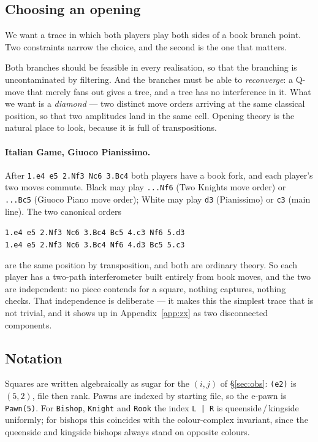 \documentclass[11pt,a4paper]{article}
\theoremstyle{definition}
\theoremstyle{plain}
\begin{document}
\subsection{Choosing an opening}

We want a trace in which both players play both sides of a book branch point.
Two constraints narrow the choice, and the second is the one that matters.

Both branches should be feasible in every realisation, so that the branching is
uncontaminated by filtering. And the branches must be able to \emph{reconverge}:
a Q-move that merely fans out gives a tree, and a tree has no interference in
it. What we want is a \emph{diamond} --- two distinct move orders arriving at
the same classical position, so that two amplitudes land in the same cell.
Opening theory is the natural place to look, because it is full of
transpositions.

\paragraph{Italian Game, Giuoco Pianissimo.}
After \texttt{1.e4 e5 2.Nf3 Nc6 3.Bc4} both players have a book fork, and each
player's two moves commute. Black may play \texttt{...Nf6} (Two Knights move
order) or \texttt{...Bc5} (Giuoco Piano move order); White may play \texttt{d3}
(Pianissimo) or \texttt{c3} (main line). The two canonical orders
\begin{center}
\texttt{1.e4 e5 2.Nf3 Nc6 3.Bc4 Bc5 4.c3 Nf6 5.d3} \\
\texttt{1.e4 e5 2.Nf3 Nc6 3.Bc4 Nf6 4.d3 Bc5 5.c3}
\end{center}
are the same position by transposition, and both are ordinary theory. So each
player has a two-path interferometer built entirely from book moves, and the two
are independent: no piece contends for a square, nothing captures, nothing
checks. That independence is deliberate --- it makes this the simplest trace
that is not trivial, and it shows up in Appendix~\ref{app:zx} as two
disconnected components.

\subsection{Notation}

Squares are written algebraically as sugar for the $(i,j)$ of
\S\ref{sec:obs}: \texttt{(e2)} is $(5,2)$, file then rank. Pawns are indexed by
starting file, so the e-pawn is \texttt{Pawn(5)}. For \texttt{Bishop},
\texttt{Knight} and \texttt{Rook} the index \texttt{L\,|\,R} is
queenside\,/\,kingside uniformly; for bishops this coincides with the
colour-complex invariant, since the queenside and kingside bishops always stand
on opposite colours.
\end{document}
